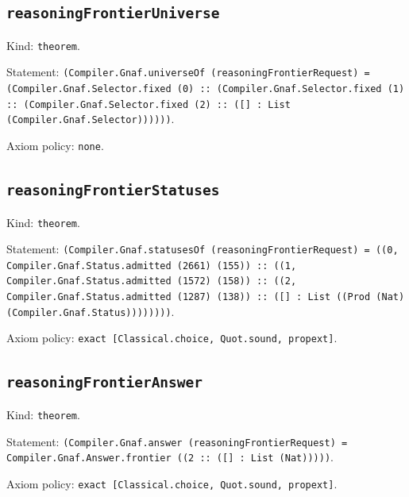 \documentclass[11pt]{article}
\begin{document}
\subsection*{\texttt{reasoningFrontierUniverse}}
\noindent Kind: \texttt{theorem}.\par
\noindent Statement: \texttt{(Compiler.Gnaf.universeOf (reasoningFrontierRequest) = (Compiler.Gnaf.Selector.fixed (0) :: (Compiler.Gnaf.Selector.fixed (1) :: (Compiler.Gnaf.Selector.fixed (2) :: ([] : List (Compiler.Gnaf.Selector))))))}.\par
\noindent Axiom policy: \texttt{none}.\par
\subsection*{\texttt{reasoningFrontierStatuses}}
\noindent Kind: \texttt{theorem}.\par
\noindent Statement: \texttt{(Compiler.Gnaf.statusesOf (reasoningFrontierRequest) = ((0, Compiler.Gnaf.Status.admitted (2661) (155)) :: ((1, Compiler.Gnaf.Status.admitted (1572) (158)) :: ((2, Compiler.Gnaf.Status.admitted (1287) (138)) :: ([] : List ((Prod (Nat) (Compiler.Gnaf.Status))))))))}.\par
\noindent Axiom policy: \texttt{exact [Classical.choice, Quot.sound, propext]}.\par
\subsection*{\texttt{reasoningFrontierAnswer}}
\noindent Kind: \texttt{theorem}.\par
\noindent Statement: \texttt{(Compiler.Gnaf.answer (reasoningFrontierRequest) = Compiler.Gnaf.Answer.frontier ((2 :: ([] : List (Nat)))))}.\par
\noindent Axiom policy: \texttt{exact [Classical.choice, Quot.sound, propext]}.\par
\end{document}
